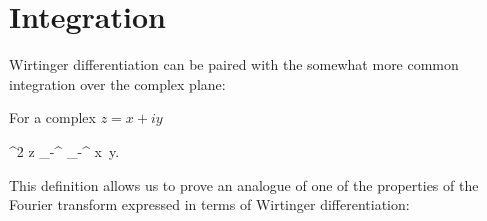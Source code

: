 \section{Integration}

Wirtinger differentiation can be paired with the somewhat more common integration over the complex plane:

\begin{definition}
\label{def:c-numbers:integration}
	For a complex $z = x + iy$
	\begin{eqn*}
		\int \upd^2 z \equiv \int_{-\infty}^{\infty} \int_{-\infty}^{\infty} \upd x\, \upd y.
	\end{eqn*}
\end{definition}

This definition allows us to prove an analogue of one of the properties of the Fourier transform expressed in terms of Wirtinger differentiation:

